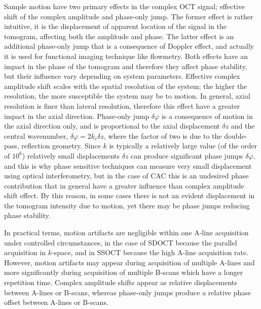 Sample motion have two primary effects in the complex OCT signal; effective shift of the complex amplitude and phase-only jump. The former effect is rather intuitive, it is the displacement of apparent location of the signal in the tomogram, affecting both the amplitude and phase. The latter effect is an additional phase-only jump that is a consequence of Doppler effect, and actually it is used for functional imaging technique like flowmetry. Both effects have an impact in the phase of the tomogram and therefore they affect phase stability, but their influence vary depending on system parameters. Effective complex amplitude shift scales with the spatial resolution of the system; the higher the resolution, the more susceptible the system may be to motion. In general, axial resolution is finer than lateral resolution, therefore this effect have a greater impact in the axial direction. Phase-only jump $\delta \varphi$ is a consequence of motion in the axial direction only, and is proportional to the axial displacement $\delta z$ and the central wavenumber, $\delta \varphi = 2k_c\delta z$, where the factor of two is due to the double-pass, reflection geometry. Since $k$ is typically a relatively large value (of the order of $10^6$) relatively small displacements $\delta z$ can produce significant phase jumps $\delta\varphi$, and this is why phase sensitive techniques can measure very small displacement using optical interferometry, but in the case of CAC this is an undesired phase contribution that in general have a greater influence than complex amplitude shift effect. By this reason, in some cases there is not an evident displacement in the tomogram intensity due to motion, yet there may be phase jumps reducing phase stability.

In practical terms, motion artifacts are negligible within one A-line acquisition under controlled circumstances, in the case of SDOCT because the parallel acquisition in $k$-space, and in SSOCT because the high A-line acquisition rate. However, motion artifacts may appear during acquisition of multiple A-lines and more significantly during acquisition of multiple B-scans which have a longer repetition time. Complex amplitude shifts appear as relative displacements between A-lines or B-scans, whereas phase-only jumps produce a relative phase offset between A-lines or B-scans.

